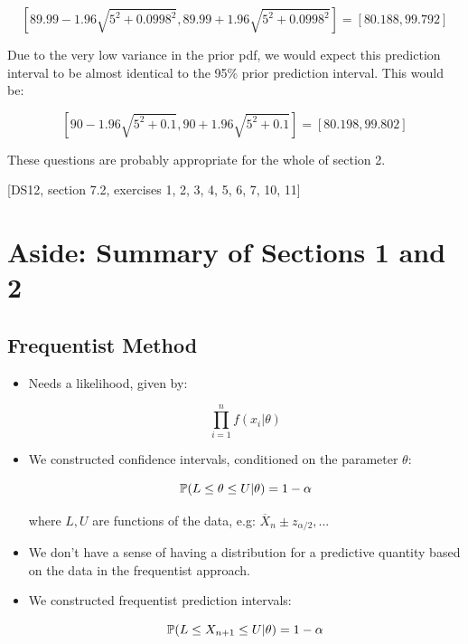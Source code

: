 \documentclass[a4paper]{article}
\begin{document}
                $$
                    [89.99 - 1.96\sqrt{5^2 + 0.0998^2}, 89.99 + 1.96\sqrt{5^2 +
                    0.0998^2}] = [80.188, 99.792]
                $$

                Due to the very low variance in the prior pdf, we would expect
                this prediction interval to be almost identical to the 95\%
                prior prediction interval. This would be:

                $$
                    [90 - 1.96 \sqrt{5^2 + 0.1}, 90 + 1.96\sqrt{5^2 + 0.1}] =
                    [80.198, 99.802]
                $$

                \begin{relq}
                    These questions are probably appropriate for the whole of
                    section 2.

                    [DS12, section 7.2, exercises 1, 2, 3, 4, 5, 6, 7, 10, 11]
                \end{relq}

    \newpage
    \section*{Aside: Summary of Sections 1 and 2}
        \subsection*{Frequentist Method}
            \begin{itemize}
                \item Needs a likelihood, given by:

                    $$
                        \prod_{i=1}^n f(x_i | \theta)
                    $$

                \item We constructed confidence intervals, conditioned on the
                    parameter $\theta$:

                    $$
                        \mathbb{P}(L \leq \theta \leq U | \theta) = 1 - \alpha
                    $$

                    where $L, U$ are functions of the data, e.g: $\overline X_n
                    \pm z_{\alpha/2}, ...$

                \item We don't have a sense of having a distribution for a
                    predictive quantity based on the data in the frequentist
                    approach.

                \item We constructed frequentist prediction intervals:

                    $$
                        \mathbb{P}(L \leq X_{n+1} \leq U | \theta) = 1 - \alpha
                    $$
            \end{itemize}
\end{document}
